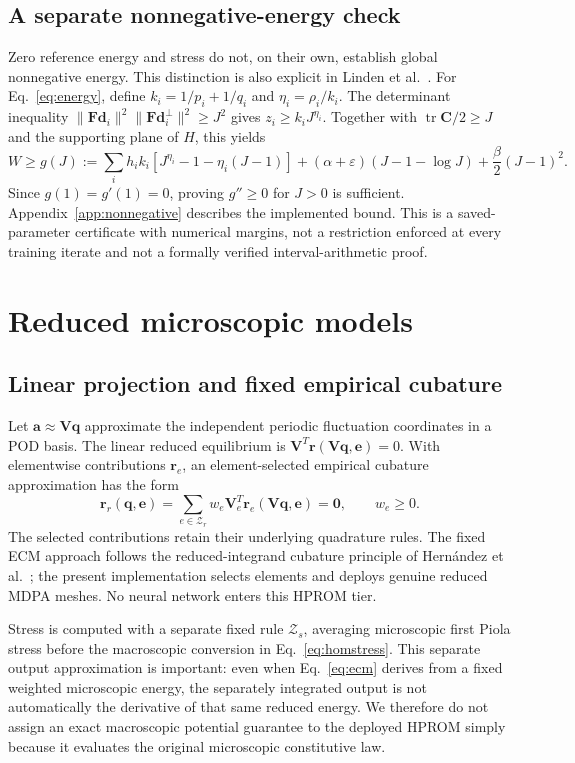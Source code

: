 \documentclass[10pt,a4paper]{article}
\newcommand{\F}{\bm F}
\newcommand{\C}{\bm C}
\newcommand{\ee}{\bm e}
\newcommand{\qq}{\bm q}
\newcommand{\tr}{\operatorname{tr}}
\begin{document}
\subsection{A separate nonnegative-energy check}
\label{sec:nonnegative}
Zero reference energy and stress do not, on their own, establish global nonnegative energy. This distinction is also explicit in Linden et al.~\cite{linden2023}. For Eq.~\eqref{eq:energy}, define $k_i=1/p_i+1/q_i$ and $\eta_i=\rho_i/k_i$. The determinant inequality $\|\F\bm d_i\|^2\|\F\bm d_i^\perp\|^2\geq J^2$ gives $z_i\geq k_iJ^{\eta_i}$. Together with $\tr\C/2\geq J$ and the supporting plane of $H$, this yields
\begin{equation}
 W\geq g(J):=\sum_i h_i k_i[J^{\eta_i}-1-\eta_i(J-1)]
 +(\alpha+\varepsilon)(J-1-\log J)+\frac\beta2(J-1)^2.
 \label{eq:lowerbound}
\end{equation}
Since $g(1)=g'(1)=0$, proving $g''\geq0$ for $J>0$ is sufficient. Appendix~\ref{app:nonnegative} describes the implemented bound. This is a saved-parameter certificate with numerical margins, not a restriction enforced at every training iterate and not a formally verified interval-arithmetic proof.

\section{Reduced microscopic models}
\label{sec:rom}
\subsection{Linear projection and fixed empirical cubature}
Let $\bm a\approx\bm V\qq$ approximate the independent periodic fluctuation coordinates in a POD basis. The linear reduced equilibrium is $\bm V^T\bm r(\bm V\qq,\ee)=0$. With elementwise contributions $\bm r_e$, an element-selected empirical cubature approximation has the form
\begin{equation}
 \bm r_r(\qq,\ee)=\sum_{e\in\mathcal Z_r}w_e\bm V_e^T
 \bm r_e(\bm V\qq,\ee)=\bm0,\qquad w_e\geq0.
 \label{eq:ecm}
\end{equation}
The selected contributions retain their underlying quadrature rules. The fixed ECM approach follows the reduced-integrand cubature principle of Hern\'andez et al.~\cite{hernandez2017}; the present implementation selects elements and deploys genuine reduced MDPA meshes. No neural network enters this HPROM tier.

Stress is computed with a separate fixed rule $\mathcal Z_s$, averaging microscopic first Piola stress before the macroscopic conversion in Eq.~\eqref{eq:homstress}. This separate output approximation is important: even when Eq.~\eqref{eq:ecm} derives from a fixed weighted microscopic energy, the separately integrated output is not automatically the derivative of that same reduced energy. We therefore do not assign an exact macroscopic potential guarantee to the deployed HPROM simply because it evaluates the original microscopic constitutive law.
\end{document}
